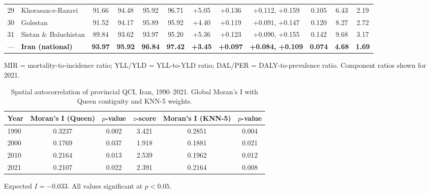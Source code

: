 \documentclass[12pt]{article}
\begin{document}
{\begin{longtable}{clcccccccccc}
29 & Khorasan-e-Razavi & 91.66 & 94.48 & 95.92 & 96.71 & +5.05 & +0.136 & +0.112, +0.159 & 0.105 & 6.43 & 2.19 \\
30 & Golestan & 91.52 & 94.17 & 95.89 & 95.92 & +4.40 & +0.119 & +0.091, +0.147 & 0.120 & 8.27 & 2.72 \\
31 & Sistan \& Baluchistan & 89.84 & 93.62 & 93.97 & 95.20 & +5.36 & +0.123 & +0.090, +0.155 & 0.142 & 9.68 & 3.17 \\
\midrule
--- & \textbf{Iran (national)} & \textbf{93.97} & \textbf{95.92} & \textbf{96.84} & \textbf{97.42} & \textbf{+3.45} & \textbf{+0.097} & \textbf{+0.084, +0.109} & \textbf{0.074} & \textbf{4.68} & \textbf{1.69} \\
\end{longtable}
}

\noindent MIR = mortality-to-incidence ratio; YLL/YLD = YLL-to-YLD ratio; DAL/PER = DALY-to-prevalence ratio. Component ratios shown for 2021.

\clearpage

\begin{table}[htbp]
\centering
\caption{Spatial autocorrelation of provincial QCI, Iran, 1990--2021. Global Moran's I with Queen contiguity and KNN-5 weights.}
\label{tab:table2}
\begin{tabular}{lccccc}
\toprule
Year & Moran's I (Queen) & $p$-value & $z$-score & Moran's I (KNN-5) & $p$-value \\
\midrule
1990 & 0.3237 & 0.002 & 3.421 & 0.2851 & 0.004 \\
2000 & 0.1769 & 0.037 & 1.918 & 0.1881 & 0.021 \\
2010 & 0.2164 & 0.013 & 2.539 & 0.1962 & 0.012 \\
2021 & 0.2107 & 0.022 & 2.391 & 0.2164 & 0.008 \\
\bottomrule
\end{tabular}

\vspace{0.5em}
\noindent\small Expected $I = -0.033$. All values significant at $p < 0.05$.
\end{table}

\clearpage
\end{document}

